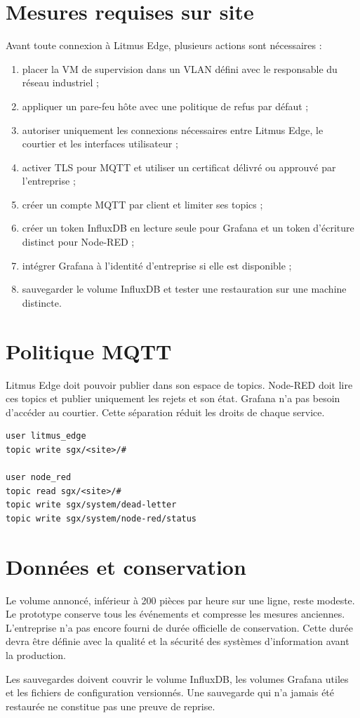 \section{Mesures requises sur site}

Avant toute connexion à Litmus Edge, plusieurs actions sont nécessaires :

\begin{enumerate}
  \item placer la VM de supervision dans un VLAN défini avec le responsable du
        réseau industriel ;
  \item appliquer un pare-feu hôte avec une politique de refus par défaut ;
  \item autoriser uniquement les connexions nécessaires entre Litmus Edge, le
        courtier et les interfaces utilisateur ;
  \item activer TLS pour MQTT et utiliser un certificat délivré ou approuvé par
        l'entreprise ;
  \item créer un compte MQTT par client et limiter ses topics ;
  \item créer un token InfluxDB en lecture seule pour Grafana et un token
        d'écriture distinct pour Node-RED ;
  \item intégrer Grafana à l'identité d'entreprise si elle est disponible ;
  \item sauvegarder le volume InfluxDB et tester une restauration sur une machine
        distincte.
\end{enumerate}

\section{Politique MQTT}

Litmus Edge doit pouvoir publier dans son espace de topics. Node-RED doit lire
ces topics et publier uniquement les rejets et son état. Grafana n'a pas besoin
d'accéder au courtier. Cette séparation réduit les droits de chaque service.

\begin{lstlisting}[caption={Extrait d'ACL MQTT de production}]
user litmus_edge
topic write sgx/<site>/#

user node_red
topic read sgx/<site>/#
topic write sgx/system/dead-letter
topic write sgx/system/node-red/status
\end{lstlisting}

\section{Données et conservation}

Le volume annoncé, inférieur à 200 pièces par heure sur une ligne, reste
modeste. Le prototype conserve tous les événements et compresse les mesures
anciennes. L'entreprise n'a pas encore fourni de durée officielle de
conservation. Cette durée devra être définie avec la qualité et la sécurité des
systèmes d'information avant la production.

Les sauvegardes doivent couvrir le volume InfluxDB, les volumes Grafana utiles
et les fichiers de configuration versionnés. Une sauvegarde qui n'a jamais été
restaurée ne constitue pas une preuve de reprise.
